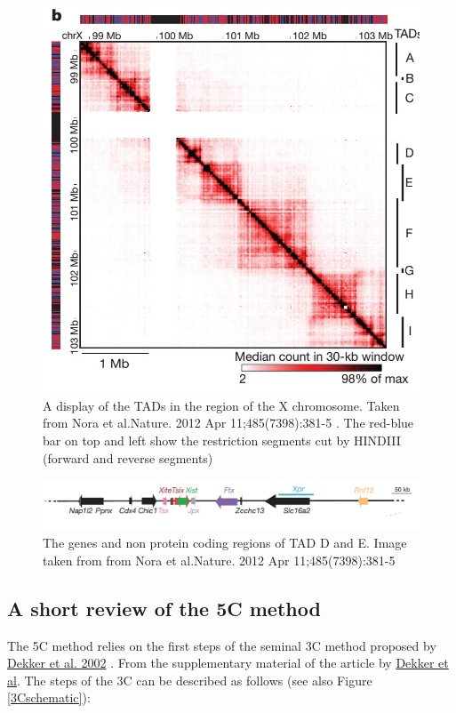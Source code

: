 \documentclass[12pt]{paper}
\begin{document}
 
\begin{figure}[H]
\includegraphics*[scale=0.5]{TADsOfTheXChromosome_NoraEtAl2012}
\caption{\scriptsize{A display of the TADs in the region of the X chromosome. Taken from Nora et al.Nature. 2012 Apr 11;485(7398):381-5 \cite{nora2012spatial}. The red-blue bar on top and left show the restriction segments cut by HINDIII (forward and reverse segments)}}
\label{TADsOfTheXChromosome}
\end{figure}

\begin{figure}[H]
\includegraphics[scale=0.3]{geneSequencesTADDandE}
\caption{\scriptsize{The genes and non protein coding regions of TAD D and E. Image taken from from Nora et al.Nature. 2012 Apr 11;485(7398):381-5 \cite{nora2012spatial}}}
\label{genesOfTadDandE}
\end{figure}

\subsection{A short review of the 5C method}
The 5C method \cite{dostie2006chromosome} relies on the first steps of the seminal 3C method proposed by \href{http://www.sciencemag.org/content/295/5558/1306.full.pdf}{Dekker et al. 2002} \cite{dekker2002capturing}. 
From the supplementary material of the article by \href{http://www.sciencemag.org/content/295/5558/1306/suppl/DC1}{Dekker et al}. The steps of the 3C can be described as follows (see also Figure \ref{3Cschematic}):
\end{document}
